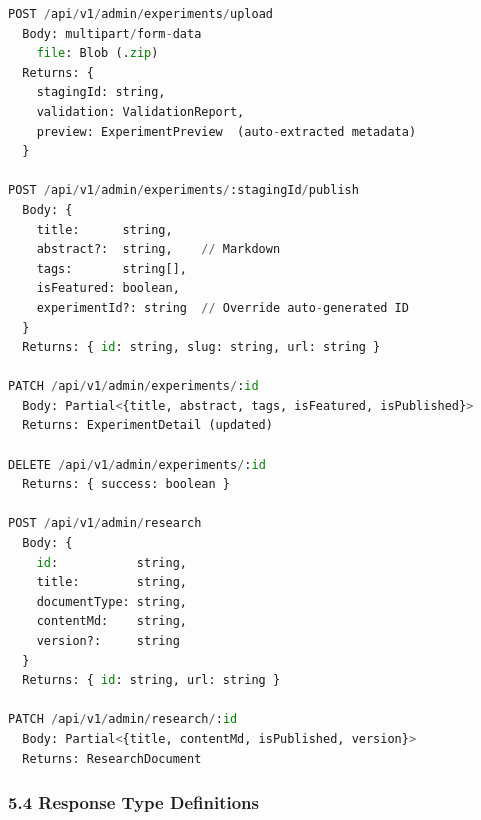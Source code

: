 \documentclass[11pt,a4paper]{article}
\begin{document}
\begin{lstlisting}[language=Python]
POST /api/v1/admin/experiments/upload
  Body: multipart/form-data
    file: Blob (.zip)
  Returns: {
    stagingId: string,
    validation: ValidationReport,
    preview: ExperimentPreview  (auto-extracted metadata)
  }

POST /api/v1/admin/experiments/:stagingId/publish
  Body: {
    title:      string,
    abstract?:  string,    // Markdown
    tags:       string[],
    isFeatured: boolean,
    experimentId?: string  // Override auto-generated ID
  }
  Returns: { id: string, slug: string, url: string }

PATCH /api/v1/admin/experiments/:id
  Body: Partial<{title, abstract, tags, isFeatured, isPublished}>
  Returns: ExperimentDetail (updated)

DELETE /api/v1/admin/experiments/:id
  Returns: { success: boolean }

POST /api/v1/admin/research
  Body: {
    id:           string,
    title:        string,
    documentType: string,
    contentMd:    string,
    version?:     string
  }
  Returns: { id: string, url: string }

PATCH /api/v1/admin/research/:id
  Body: Partial<{title, contentMd, isPublished, version}>
  Returns: ResearchDocument
\end{lstlisting}

\subsubsection*{5.4 Response Type Definitions}
\end{document}
